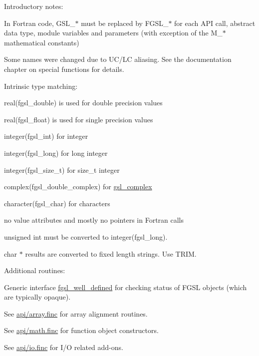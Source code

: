
\begin{DoxyEnumerate}
\item Introductory notes\-: 
\begin{DoxyItemize}
\item In Fortran code, G\-S\-L\-\_\-$\ast$ must be replaced by F\-G\-S\-L\-\_\-$\ast$ for each A\-P\-I call, abstract data type, module variables and parameters (with exception of the M\-\_\-$\ast$ mathematical constants) 
\item Some names were changed due to U\-C/\-L\-C aliasing. See the documentation chapter on special functions for details. 
\item Intrinsic type matching\-:
\begin{DoxyEnumerate}
\item real(fgsl\-\_\-double) is used for double precision values
\item real(fgsl\-\_\-float) is used for single precision values
\item integer(fgsl\-\_\-int) for integer
\item integer(fgsl\-\_\-long) for long integer
\item integer(fgsl\-\_\-size\-\_\-t) for size\-\_\-t integer
\item complex(fgsl\-\_\-double\-\_\-complex) for \hyperlink{structfgsl_1_1gsl__complex}{gsl\-\_\-complex}
\item character(fgsl\-\_\-char) for characters
\item no value attributes and mostly no pointers in Fortran calls
\item unsigned int must be converted to integer(fgsl\-\_\-long).
\item char $\ast$ results are converted to fixed length strings. Use T\-R\-I\-M. 
\end{DoxyEnumerate}
\end{DoxyItemize}
\item Additional routines\-: 
\begin{DoxyItemize}
\item Generic interface \hyperlink{interfacefgsl__well__defined}{fgsl\-\_\-well\-\_\-defined} for checking status of F\-G\-S\-L objects (which are typically opaque). 
\item See \hyperlink{array_8finc}{api/array.\-finc} for array alignment routines. 
\item See \hyperlink{math_8finc}{api/math.\-finc} for function object constructors. 
\item See \hyperlink{io_8finc}{api/io.\-finc} for I/\-O related add-\/ons. 

\end{DoxyItemize}
\end{DoxyEnumerate}
